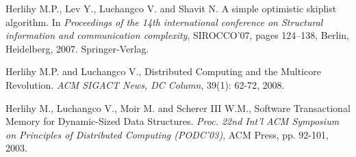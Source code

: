 \begin{thebibliography}{99}
{%




Herlihy M.P., Lev Y., Luchangco V. and Shavit N.
\newblock A simple optimistic skiplist algorithm.
\newblock In {\em Proceedings of the 14th international conference on
  Structural information and communication complexity}, SIROCCO'07, pages
  124--138, Berlin, Heidelberg, 2007. Springer-Verlag.



Herlihy M.P.  and Luchangco V.,
Distributed Computing and the Multicore Revolution.
{\it ACM SIGACT News, DC Column}, 39(1): 62-72, 2008.





Herlihy M.,  Luchangco V.,  Moir M. and  Scherer III W.M., 
 Software Transactional Memory for Dynamic-Sized Data Structures. 
{\it  Proc. 22nd  Int'l  ACM Symposium on Principles of  Distributed 
Computing (PODC'03)},  ACM Press, pp. 92-101,  2003. 

% 
% 




}
\end{thebibliography}
